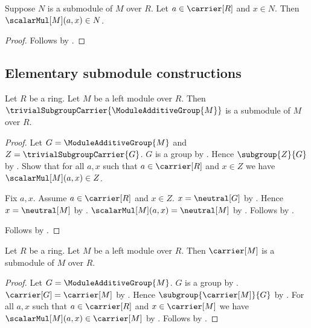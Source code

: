 \begin{proposition}\label{submodule_scalar}
    Suppose $N$ is a submodule of $M$ over $R$.
    Let $a\in\carrier[R]$ and $x\in N$.
    Then $\scalarMul[M](a,x)\in N$.
\end{proposition}
\begin{proof}
    Follows by .
\end{proof}

\subsection{Elementary submodule constructions}

\begin{proposition}\label{zero_submodule}
    Let $R$ be a ring.
    Let $M$ be a left module over $R$.
    Then $\trivialSubgroupCarrier{\ModuleAdditiveGroup{M}}$
        is a submodule of $M$ over $R$.
\end{proposition}
\begin{proof}
    Let $G=\ModuleAdditiveGroup{M}$ and
        $Z=\trivialSubgroupCarrier{G}$.
    $G$ is a group by .
    Hence $\subgroup{Z}{G}$ by .
    Show that for all $a,x$ such that $a\in\carrier[R]$ and $x\in Z$
        we have $\scalarMul[M](a,x)\in Z$.
    \begin{subproof}
        Fix $a,x$.
        Assume $a\in\carrier[R]$ and $x\in Z$.
        $x=\neutral[G]$ by
            .
        Hence $x=\neutral[M]$ by
            .
        $\scalarMul[M](a,x)=\neutral[M]$ by
            .
        Follows by
            .
    \end{subproof}
    Follows by .
\end{proof}

\begin{proposition}\label{module_carrier_submodule}
    Let $R$ be a ring.
    Let $M$ be a left module over $R$.
    Then $\carrier[M]$ is a submodule of $M$ over $R$.
\end{proposition}
\begin{proof}
    Let $G=\ModuleAdditiveGroup{M}$.
    $G$ is a group by .
    $\carrier[G]=\carrier[M]$ by
        .
    Hence $\subgroup{\carrier[M]}{G}$ by
        .
    For all $a,x$ such that $a\in\carrier[R]$ and
        $x\in\carrier[M]$ we have
        $\scalarMul[M](a,x)\in\carrier[M]$ by
        .
    Follows by .
\end{proof}

